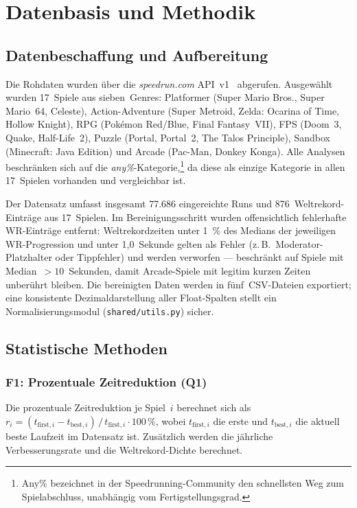 \chapter{Datenbasis und Methodik}
\label{chap:methodik}

\section{Datenbeschaffung und Aufbereitung}

Die Rohdaten wurden über die \textit{speedrun.com} API~v1~\cite{speedruncom_api} abgerufen. Ausgewählt wurden 17~Spiele aus sieben~Genres: Platformer (Super Mario Bros., Super Mario~64, Celeste), Action-Adventure (Super Metroid, Zelda: Ocarina of Time, Hollow Knight), RPG (Pokémon Red/Blue, Final Fantasy~VII), FPS (Doom~3, Quake, Half-Life~2), Puzzle (Portal, Portal~2, The Talos Principle), Sandbox (Minecraft: Java Edition) und Arcade (Pac-Man, Donkey Konga). Alle Analysen beschränken sich auf die \emph{any\%}-Kategorie,\footnote{Any\% bezeichnet in der Speedrunning-Community den schnellsten Weg zum Spielabschluss, unabhängig vom Fertigstellungsgrad.} da diese als einzige Kategorie in allen 17~Spielen vorhanden und vergleichbar ist.

Der Datensatz umfasst insgesamt 77.686 eingereichte Runs und 876~Weltrekord-Einträge aus 17~Spielen. Im Bereinigungsschritt wurden offensichtlich fehlerhafte WR-Einträge entfernt: Weltrekordzeiten unter 1~\% des Medians der jeweiligen WR-Progression und unter 1{,}0~Sekunde gelten als Fehler (z.\,B.\ Moderator-Platzhalter oder Tippfehler) und werden verworfen --- beschränkt auf Spiele mit Median~$> 10$~Sekunden, damit Arcade-Spiele mit legitim kurzen Zeiten unberührt bleiben. Die bereinigten Daten werden in fünf~CSV-Dateien exportiert; eine konsistente Dezimaldarstellung aller Float-Spalten stellt ein Normalisierungsmodul (\texttt{shared/utils.py}) sicher.

\section{Statistische Methoden}

\subsection*{F1: Prozentuale Zeitreduktion (Q1)}

Die prozentuale Zeitreduktion je Spiel~$i$ berechnet sich als $r_i = (t_{\text{first},i} - t_{\text{best},i})\,/\,t_{\text{first},i} \cdot 100\,\%$, wobei $t_{\text{first},i}$ die erste und $t_{\text{best},i}$ die aktuell beste Laufzeit im Datensatz ist. Zusätzlich werden die jährliche Verbesserungsrate und die Weltrekord-Dichte berechnet.


